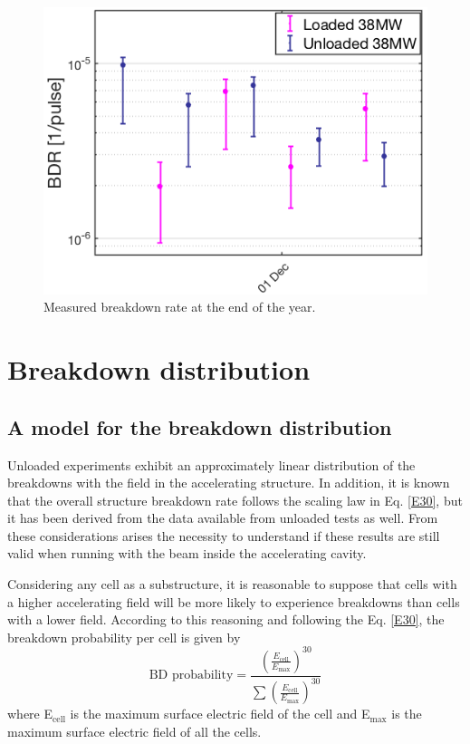 \begin{figure}[h]
\centering 
\includegraphics[scale=0.55]{pictures/BDR_last_part_year.png}
\caption{Measured breakdown rate at the end of the year.}
\label{BD_prob_last_raise}
\end{figure}





\section[Breakdown distribution]{Breakdown distribution}

\subsection[A model for the breakdown distribution]{A model for the breakdown distribution}

Unloaded experiments exhibit an approximately linear distribution of the breakdowns with the field in the accelerating structure. In addition, it is known that the overall structure breakdown rate follows the scaling law in Eq. \ref{E30}, but it has been derived from the data available from unloaded tests as well. From these considerations arises the necessity to understand if these results are still valid when running with the beam inside the accelerating cavity.

Considering any cell as a substructure, it is reasonable to suppose that cells with a higher accelerating field will be more likely to experience breakdowns than cells with a lower field. According to this reasoning and following the Eq. \ref{E30}, the breakdown probability per cell is given by
\begin{equation}
\text{BD probability} =\frac{   \left ( \frac{E_\text{cell}}{E_\text{max}} \right )^{30} }{ \sum \left( \frac{E_\text{cell}}{E_\text{max}} \right )^{30}   } 
\end{equation}
where E$_\text{cell}$ is the maximum surface electric field of the cell and E$_\text{max}$ is the maximum surface electric field of all the cells. 

